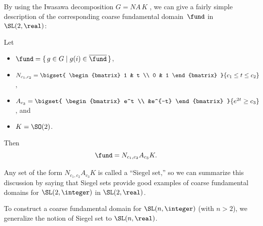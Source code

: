 By using the Iwasawa decomposition $G = N A \, K$ , we can give a fairly simple description of the corresponding coarse fundamental domain~$\fund$ in $\SL(2,\real)$:

\begin{eg}  \label{SiegelSL2ZinSL2R}
Let
\noprelistbreak
	\begin{itemize}
	\item
	$\fund = \{\, g \in G \mid g(i) \in \overline{\fund} \,\}$, 
	\item $N_{c_1,c_2} = \bigset{
	\begin{bmatrix} 1 & t \\ 0 & 1 \end{bmatrix}
	}{
	c_1 \le t \le c_2}$, 
	\item $A_{c_3} = \bigset{
	\begin{bmatrix} e^t \\ &e^{-t} \end{bmatrix}
	}{
	e^{2t} \ge c_3}$,
	and
	\item $K = \SO(2)$.
	\end{itemize}
Then 
	$$\fund = N_{c_1,c_2} A_{c_3} K  .$$
\end{eg}

Any set of the form $N_{c_1,c_2} A_{c_3} K$ is called a ``Siegel set\zz,''  so we can summarize this discussion by saying that Siegel sets provide good examples of coarse fundamental domains for $\SL(2,\integer)$ in $\SL(2,\real)$. 

To construct a coarse fundamental domain for $\SL(n,\integer)$ (with $n > 2$), we generalize the notion of Siegel set to $\SL(n,\real)$.


